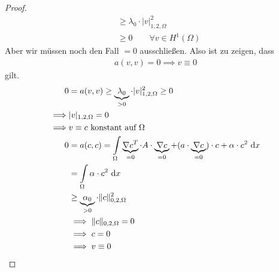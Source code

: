 \begin{proof}
\begin{align*}
		&\geq\lambda_0\cdot |v|^2_{1,2,\Omega}\\
		&\geq 0\qquad\forall v\in H^1(\Omega)
	\end{align*}
	Aber wir müssen noch den Fall \dq$=0$\dq{} ausschließen. Also ist zu zeigen, dass
	\begin{align*}
		a(v,v)=0\implies v\equiv 0
	\end{align*}
	gilt.
	\begin{align*}
		0&=a(v,v)\geq\underbrace{\lambda_0}_{>0}\cdot|v|^2_{1,2,\Omega}\geq0 \\
		\implies& |v|_{1,2,\Omega}=0 \\
		\implies& v\equiv c\text{ konstant auf }\Omega\\
		0&=a(c,c)=\int\limits_\Omega\underbrace{\nabla c^T}_{=0}\cdot A\cdot\underbrace{\nabla c}_{=0}+(a\cdot\underbrace{\nabla c}_{=0})\cdot c+\alpha\cdot c^2\text{ d} x\\
		&=\int\limits_\Omega\alpha\cdot c^2\text{ d} x\\
		&\geq\underbrace{\alpha_0}_{>0}\cdot\Vert c\Vert^2_{0,2,\Omega}\\
		&\implies\Vert c\Vert_{0,2,\Omega}=0\\
		&\implies c=0\\
		&\implies v\equiv 0
	\end{align*}


\end{proof}
